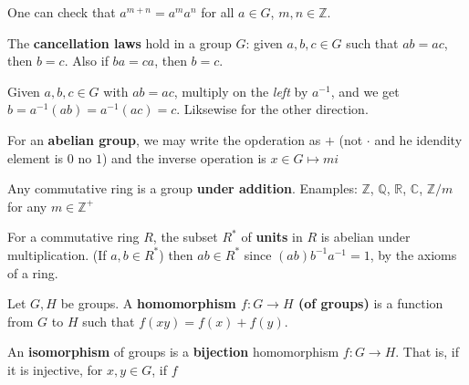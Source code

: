\documentclass{notes}
\begin{document}
One can check that $a^{m + n} = a^m a^n$ for all $a \in G$, $m, n \in \mathbb Z$.

\begin{lem}
  The {\boldmath \bfseries cancellation laws} hold in a group $G$: given $a, b, c \in G$ such that $a b = a c$, then $b = c$.
  Also if $b a = c a$, then $b = c$.
\end{lem}

\begin{prf}
  Given $a, b, c \in G$ with $a b = a c$, multiply on the \textit{left} by $a^{-1}$, and we get $b = a^{-1} (a b) = a^{-1} (a c) = c$.
  Liksewise for the other direction.
\end{prf}

\begin{rmk}
  For an {\boldmath \bfseries abelian group}, we may write the opderation as $+$ (not $\cdot$ and he idendity element is $0$ no $1$) and the inverse operation is $x \in G \mapsto mi$
\end{rmk}

\begin{eg}
  Any commutative ring is a group {\boldmath \bfseries under addition}.
  Enamples: $\mathbb Z$, $\mathbb Q$, $\mathbb R$, $\mathbb C$, $\mathbb Z / m$ for any $m \in \mathbb Z^+$
\end{eg}

\begin{eg}
  For a commutative ring $R$, the subset $R^*$ of {\boldmath \bfseries units} in $R$ is abelian under multiplication.
  (If $a, b \in R^*$) then $a b \in R^*$ since $(a b) b^{-1} a^{-1} = 1$, by the axioms of a ring.
\end{eg}

\begin{defn}
  Let $G, H$ be groups.
  A {\boldmath \bfseries homomorphism $f \colon G \to H$ (of groups)} is a function from $G$ to $H$ such that $f(xy) = f (x) + f(y)$.
\end{defn}

\begin{defn}
  An {\boldmath \bfseries isomorphism} of groups is a {\boldmath \bfseries bijection} homomorphism $f \colon G \to H$.
  That is, if it is injective, for $x, y \in G$, if $f$
\end{defn}
\end{document}
